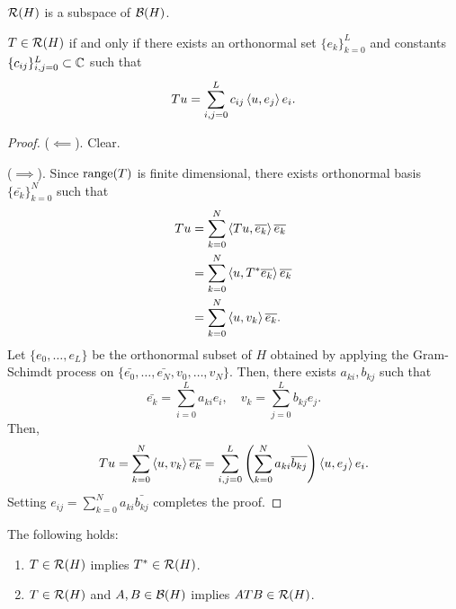 \documentclass[a4paper]{article}
\begin{document}
\begin{thm}
$\mathcal{R} (H)$ is a subspace of $\mathcal{B} (H)$.
\end{thm}

\begin{thm}
$T \in \mathcal{R} (H)$ if and only if there exists an 
orthonormal set $\{e_k\}_{k=0}^L$ and constants
$\{c_{ij}\}_{i,j=0}^L \subset \mathbb{C}$ such that 
\[
T u = \sum_{i, j = 0}^L c_{ij} \left\langle u, e_j \right\rangle e_i.
\]
\end{thm}

\begin{proof}
($\impliedby$). Clear. 

($\implies$). Since $\operatorname{range}(T)$ is finite dimensional, there 
exists orthonormal basis $\{\bar{e_k}\}_{k=0}^N$ such that 
\[
\begin{aligned}
  T u 
  &= \sum_{k=0}^N \left\langle T u, \overline{e_k} \right\rangle \overline{e_k} \\
  &= \sum_{k=0}^N \left\langle u, T^* \overline{e_k} \right\rangle \overline{e_k} \\
  &= \sum_{k=0}^N \left\langle u, v_k \right\rangle \overline{e_k}.
\end{aligned}
\]
Let $\{e_0, \dots, e_L\}$ be the orthonormal subset 
of $H$ obtained by applying the Gram-Schimdt process 
on $\{\bar{e_0}, \dots, \bar{e_N}, v_0, \dots, v_N\}$. 
Then, there exists $a_{ki}, b_{kj}$ such that 
\[
\bar{e_k} = \sum_{i=0}^L a_{ki} e_i, \quad 
v_k = \sum_{j=0}^L b_{kj} e_j.
\]
Then, 
\[
T u = \sum_{k=0}^N \left\langle u, v_k \right\rangle \overline{e_k}
= \sum_{i, j = 0}^L \left( \sum_{k=0}^N a_{ki} 
\overline{b_{kj}} \right) \left\langle u, e_j \right\rangle e_i.
\]
Setting $e_{ij} = \sum_{k=0}^N a_{ki} \bar{b_{kj}}$
completes the proof.
\end{proof}

\begin{thm}
The following holds:
\begin{enumerate}
  \item $T \in \mathcal{R}(H)$ implies $T^* \in \mathcal{R} (H)$. 
  \item $T \in \mathcal{R}(H)$ and $A, B \in \mathcal{B}(H)$ implies 
  $A T B \in \mathcal{R}(H)$.
\end{enumerate}
\end{thm}
\end{document}

